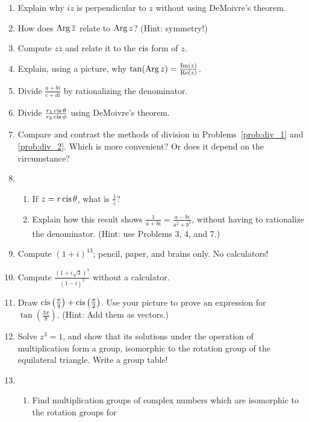 \documentclass[../textbook.tex]{subfiles}
\begin{document}
\begin{enumerate}
\item Explain why $iz$ is perpendicular to $z$ without using DeMoivre's theorem.
\item How does $\operatorname{Arg} \overline{z}$ relate to $\operatorname{Arg} z$? (Hint: symmetry!)
\item Compute $z\overline{z}$ and relate it to the $\operatorname{cis}$ form of $z$.
\item Explain, using a picture, why $\tan (\operatorname{Arg} z) = \frac{\operatorname{Im}(z)}{\operatorname{Re}(z)}$.
\item Divide $\frac{a+bi}{c+di}$ by rationalizing the denominator.~\label{prob:div_1}
\item Divide $\frac{r_1\operatorname{cis} \theta}{r_2\operatorname{cis} \phi}$ using DeMoivre's theorem.~\label{prob:div_2}
\item Compare and contrast the methods of division in Problems~\ref{prob:div_1} and \ref{prob:div_2}. Which is more convenient? Or does it depend on the circumstance?
\item \begin{enumerate}
\item If $z = r\operatorname{cis} \theta$, what is $\frac{1}{z}$?
\item Explain how this result shows $\frac{1}{a+bi}=\frac{a-bi}{a^2+b^2}$, without having to rationalize the denominator. (Hint: use Problems 3, 4, and 7.)
\end{enumerate}
\item Compute $(1+i)^{13}$; pencil, paper, and brains only. No calculators!
\item Compute $\frac{(1+i\sqrt{3})^3}{(1-i)^2}$ without a calculator.
\item Draw $\operatorname{cis}\left(\frac{\pi}{4}\right) + \operatorname{cis}\left(\frac{\pi}{2}\right)$. Use your picture to prove an expression for $\tan\left(\frac{3\pi}{8}\right)$. (Hint: Add them as vectors.)
\item Solve $z^3 = 1$, and show that its solutions under the operation of multiplication form a group, isomorphic to the rotation group of the equilateral triangle. Write a group table!
\item \begin{enumerate}
\item Find multiplication groups of complex numbers which are isomorphic to the rotation groups for
\begin{enumerate}
\end{enumerate}
\end{enumerate}
\end{enumerate}
\end{document}
